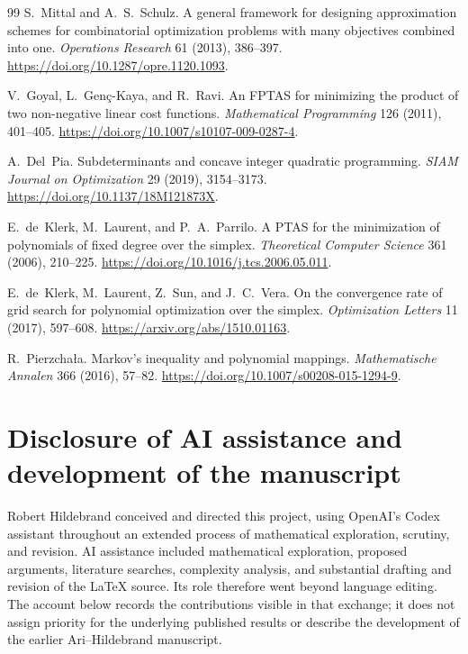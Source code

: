 \documentclass[11pt]{article}
\theoremstyle{definition}\newtheorem{definition}{Definition}[section]
\theoremstyle{remark}\newtheorem{remark}[theorem]{Remark}
\begin{document}
\begin{thebibliography}{99}
 S.~Mittal and A.~S.~Schulz.
A general framework for designing approximation schemes for combinatorial optimization problems with many objectives combined into one.
\emph{Operations Research} 61 (2013), 386--397.
\url{https://doi.org/10.1287/opre.1120.1093}.

 V.~Goyal, L.~Gen\c{c}-Kaya, and R.~Ravi.
An FPTAS for minimizing the product of two non-negative linear cost functions.
\emph{Mathematical Programming} 126 (2011), 401--405.
\url{https://doi.org/10.1007/s10107-009-0287-4}.

 A.~Del~Pia.
Subdeterminants and concave integer quadratic programming.
\emph{SIAM Journal on Optimization} 29 (2019), 3154--3173.
\url{https://doi.org/10.1137/18M121873X}.

 E.~de~Klerk, M.~Laurent, and P.~A.~Parrilo.
A PTAS for the minimization of polynomials of fixed degree over the simplex.
\emph{Theoretical Computer Science} 361 (2006), 210--225.
\url{https://doi.org/10.1016/j.tcs.2006.05.011}.

 E.~de~Klerk, M.~Laurent, Z.~Sun, and J.~C.~Vera.
On the convergence rate of grid search for polynomial optimization over the simplex.
\emph{Optimization Letters} 11 (2017), 597--608.
\url{https://arxiv.org/abs/1510.01163}.

 R.~Pierzcha\l a. Markov's inequality and polynomial mappings.
\emph{Mathematische Annalen} 366 (2016), 57--82.
\url{https://doi.org/10.1007/s00208-015-1294-9}.

\end{thebibliography}

\section*{Disclosure of AI assistance and development of the manuscript}

Robert Hildebrand conceived and directed this project, using OpenAI's Codex assistant throughout an extended process of mathematical exploration, scrutiny, and revision. AI assistance included mathematical exploration, proposed arguments, literature searches, complexity analysis, and substantial drafting and revision of the \LaTeX{} source. Its role therefore went beyond language editing. The account below records the contributions visible in that exchange; it does not assign priority for the underlying published results or describe the development of the earlier Ari--Hildebrand manuscript.
\end{document}
